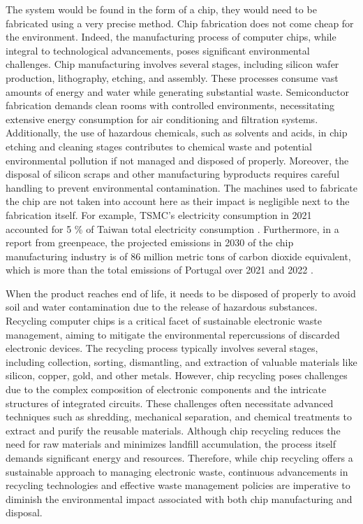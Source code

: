 The system would be found in the form of a chip, they would need to be fabricated using a very precise method. Chip fabrication does not come cheap for the environment. Indeed, the manufacturing process of computer chips, while integral to technological advancements, poses significant environmental challenges. Chip manufacturing involves several stages, including silicon wafer production, lithography, etching, and assembly. These processes consume vast amounts of energy and water while generating substantial waste. Semiconductor fabrication demands clean rooms with controlled environments, necessitating extensive energy consumption for air conditioning and filtration systems. Additionally, the use of hazardous chemicals, such as solvents and acids, in chip etching and cleaning stages contributes to chemical waste and potential environmental pollution if not managed and disposed of properly. Moreover, the disposal of silicon scraps and other manufacturing byproducts requires careful handling to prevent environmental contamination. The machines used to fabricate the chip are not taken into account here as their impact is negligible next to the fabrication itself. For example, TSMC's electricity consumption in 2021 accounted for 5 \% of Taiwan total electricity consumption \cite{chipEnv}. Furthermore, in a report from greenpeace, the projected emissions in 2030 of the chip manufacturing industry is of 86 million metric tons of carbon dioxide equivalent, which is more than the total emissions of Portugal over 2021 and 2022 \cite{greenReport,worldEmissions}.

When the product reaches end of life, it needs to be disposed of properly to avoid soil and water contamination due to the release of hazardous substances. Recycling computer chips is a critical facet of sustainable electronic waste management, aiming to mitigate the environmental repercussions of discarded electronic devices. The recycling process typically involves several stages, including collection, sorting, dismantling, and extraction of valuable materials like silicon, copper, gold, and other metals. However, chip recycling poses challenges due to the complex composition of electronic components and the intricate structures of integrated circuits. These challenges often necessitate advanced techniques such as shredding, mechanical separation, and chemical treatments to extract and purify the reusable materials. Although chip recycling reduces the need for raw materials and minimizes landfill accumulation, the process itself demands significant energy and resources. Therefore, while chip recycling offers a sustainable approach to managing electronic waste, continuous advancements in recycling technologies and effective waste management policies are imperative to diminish the environmental impact associated with both chip manufacturing and disposal.

